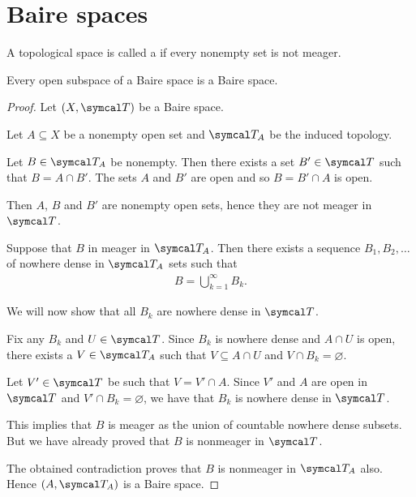 \section{Baire spaces}\label{sec:baire_spaces}

\begin{definition}\label{def:baire_space}
  A topological space is called a  if every nonempty set is not meager.
\end{definition}

\begin{proposition}\label{thm:open_subspace_of_baire_space_is_baire}
  Every open subspace of a Baire space is a Baire space.
\end{proposition}
\begin{proof}
  Let $(X, \Cal{T})$ be a Baire space.

  Let $A \subseteq X$ be a nonempty open set and $\Cal{T}_A$ be the induced topology.

  Let $B \in \Cal{T}_A$ be nonempty. Then there exists a set $B' \in \Cal{T}$ such that $B = A \cap B'$. The sets $A$ and $B'$ are open and so $B = B' \cap A$ is open.

  Then $A$, $B$ and $B'$ are nonempty open sets, hence they are not meager in $\Cal{T}$.

  Suppose that $B$ in meager in $\Cal{T}_A$. Then there exists a sequence $B_1, B_2, \ldots$ of nowhere dense in $\Cal{T}_A$ sets such that
  \begin{align*}
    B = \bigcup_{k=1}^\infty B_k.
  \end{align*}

  We will now show that all $B_k$ are nowhere dense in $\Cal{T}$.

  Fix any $B_k$ and $U \in \Cal{T}$. Since $B_k$ is nowhere dense and $A \cap U$ is open, there exists a $V \in \Cal{T}_A$ such that $V \subseteq A \cap U$ and $V \cap B_k = \varnothing$.

  Let $V' \in \Cal{T}$ be such that $V = V' \cap A$. Since $V'$ and $A$ are open in $\Cal{T}$ and $V' \cap B_k = \varnothing$, we have that $B_k$ is nowhere dense in $\Cal{T}$.

  This implies that $B$ is meager as the union of countable nowhere dense subsets. But we have already proved that $B$ is nonmeager in $\Cal{T}$.

  The obtained contradiction proves that $B$ is nonmeager in $\Cal{T}_A$ also. Hence $(A, \Cal{T}_A)$ is a Baire space.
\end{proof}
